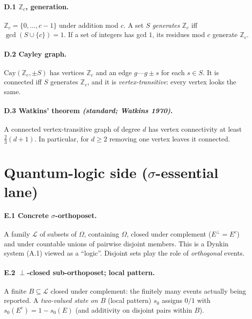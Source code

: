 \documentclass[11pt]{article}
\theoremstyle{definition}
\theoremstyle{remark}
\newcommand{\bbZ}{\mathbb{Z}}
\begin{document}
\paragraph{D.1 $\bbZ_c$, generation.} $\bbZ_c=\{0,\dots,c-1\}$ under addition mod
$c$. A set $S$ \emph{generates} $\bbZ_c$ iff $\gcd(S\cup\{c\})=1$. If a set of
integers has gcd $1$, its residues mod $c$ generate $\bbZ_c$.

\paragraph{D.2 Cayley graph.} $\mathrm{Cay}(\bbZ_c,\pm S)$ has vertices $\bbZ_c$
and an edge $g$---$g\pm s$ for each $s\in S$. It is connected iff $S$ generates
$\bbZ_c$, and it is \emph{vertex-transitive}: every vertex looks the same.

\paragraph{D.3 Watkins' theorem \emph{(standard; Watkins 1970)}.} A connected
vertex-transitive graph of degree $d$ has vertex connectivity at least
$\tfrac23(d+1)$. In particular, for $d\ge2$ removing one vertex leaves it
connected.

\section{Quantum-logic side ($\sigma$-essential lane)}

\paragraph{E.1 Concrete $\sigma$-orthoposet.} A family $\mathcal L$ of subsets of
$\Omega$, containing $\Omega$, closed under complement ($E^\perp=E^c$) and under
countable unions of pairwise disjoint members. This is a Dynkin system (A.1)
viewed as a ``logic''. Disjoint sets play the role of \emph{orthogonal} events.

\paragraph{E.2 $\perp$-closed sub-orthoposet; local pattern.} A finite
$B\subseteq\mathcal L$ closed under complement: the finitely many events actually
being reported. A \emph{two-valued state on $B$} (local pattern) $s_0$ assigns
$0/1$ with $s_0(E^c)=1-s_0(E)$ (and additivity on disjoint pairs within $B$).
\end{document}
